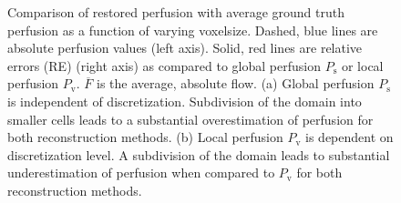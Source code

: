 \documentclass[final,5p,times,twocolumn]{elsarticle}
\begin{document}
\begin{figure}[]
\begin{tabular}{c c}
    	\end{tabular}
    	\caption{Comparison of restored perfusion with average ground truth perfusion as a function of varying voxelsize. Dashed, blue lines are absolute perfusion values (left axis). Solid, red lines are relative errors (RE) (right axis) as compared to global perfusion $P_{\mathrm{s}}$ or local perfusion $P_{\mathrm{v}}$. $\overline{F}$ is the average, absolute flow. (a) Global perfusion $P_{\mathrm{s}}$ is independent of discretization.  Subdivision of the domain into smaller cells leads to a substantial overestimation of perfusion for both reconstruction methods. (b) Local perfusion $P_{\mathrm{v}}$ is dependent on discretization level. A subdivision of the domain leads to substantial underestimation of perfusion when compared to $P_{\mathrm{v}}$ for both reconstruction methods.}
            \label{fig:volnormperf}
    \end{figure}
    
\end{document}
